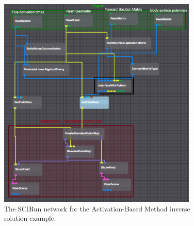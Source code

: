     \begin{figure}
        \begin{center}
        \includegraphics[width=0.9\textwidth]{ECGToolkitGuide_figures/activationBasedNetwork.png}
        \caption{The SCIRun network for the Activation-Based Method inverse solution example.}
        \label{fig:activationBasedNetwork}
        \end{center}
    \end{figure}



    


